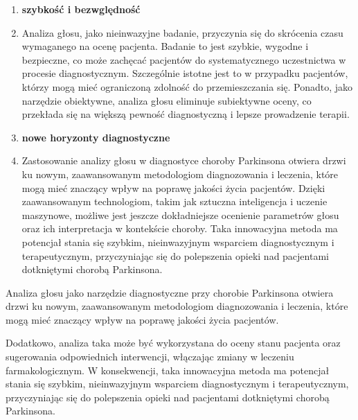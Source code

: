 \begin{enumerate}
	\item \textbf{szybkość i bezwględność}
	\item []Analiza głosu, jako nieinwazyjne badanie, przyczynia się do skrócenia czasu wymaganego na ocenę pacjenta. Badanie to jest szybkie, wygodne i bezpieczne, co może zachęcać pacjentów do systematycznego uczestnictwa w procesie diagnostycznym. Szczególnie istotne jest to w przypadku pacjentów, którzy mogą mieć ograniczoną zdolność do przemieszczania się. Ponadto, jako narzędzie obiektywne, analiza głosu eliminuje subiektywne oceny, co przekłada się na większą pewność diagnostyczną i lepsze prowadzenie terapii.
	\item \textbf{nowe horyzonty diagnostyczne}
	\item[] Zastosowanie analizy głosu w diagnostyce choroby Parkinsona otwiera drzwi ku nowym, zaawansowanym metodologiom diagnozowania i leczenia, które mogą mieć znaczący wpływ na poprawę jakości życia pacjentów. Dzięki zaawansowanym technologiom, takim jak sztuczna inteligencja i uczenie maszynowe, możliwe jest jeszcze dokładniejsze ocenienie parametrów głosu oraz ich interpretacja w kontekście choroby. Taka innowacyjna metoda ma potencjał stania się szybkim, nieinwazyjnym wsparciem diagnostycznym i terapeutycznym, przyczyniając się do polepszenia opieki nad pacjentami dotkniętymi chorobą Parkinsona.
\end{enumerate}

Analiza głosu jako narzędzie diagnostyczne przy chorobie Parkinsona otwiera drzwi ku nowym, zaawansowanym metodologiom diagnozowania i leczenia, które mogą mieć znaczący wpływ na poprawę jakości życia pacjentów.

Dodatkowo, analiza taka może być wykorzystana do oceny stanu pacjenta oraz sugerowania odpowiednich interwencji, włączając zmiany w leczeniu farmakologicznym.
W konsekwencji, taka innowacyjna metoda ma potencjał stania się szybkim, nieinwazyjnym wsparciem diagnostycznym i terapeutycznym, przyczyniając się do polepszenia
opieki nad pacjentami dotkniętymi chorobą Parkinsona.